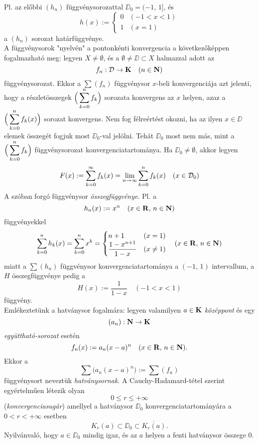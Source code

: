 Pl. az előbbi $(h_n)$ függvénysorozattal $\DD_0 = (-1, \, 1]$, és
\[
	h(x) := \begin{cases}
		0 & (-1 < x < 1) \\
		1 & (x = 1)
	\end{cases}
\]
a $(h_n)$ sorozat határfüggvénye.\\

A függvénysorok "nyelvén" a pontonkénti konvergencia a következőképpen fogalmazható meg: legyen $X \neq \emptyset$, és a $\emptyset \neq \DD \subset X$ halmazzal adott az
\[
	f_n : \mathcal{D} \to \mathbf{K} \quad (n \in \mathbf{N})
\]
függvénysorozat. Ekkor a $\sum(f_n)$ függvénysor $x$-beli konvergenciája azt jelenti, hogy a részletösszegek $\displaystyle \Big(\sum_{k=0}^n f_k \Big)$ sorozata konvergens az $x$ helyen, azaz a $\displaystyle \Big(\sum_{k=0}^n f_k(x) \Big)$ sorozat konvergens. Nem fog félreértést okozni, ha az ilyen $x \in \DD$ elemek összegét fogjuk most $\DD_0$-val jelölni. Tehát $\DD_0$ most nem más, mint a $\displaystyle \Big(\sum_{k=0}^n f_k \Big)$ függvénysorozat konvergenciatartománya. Ha $\DD_0 \neq \emptyset$, akkor legyen
\[
	F(x) := \sum_{k=0}^\infty f_k(x) = \lim_{n \to \infty} \sum_{k=0}^n f_k(x) \quad (x \in \mathcal{D}_0)
\]
A szóban forgó függvénysor \textit{összegfüggvénye}. Pl. a
\[
	h_n(x) := x^n \quad (x \in \mathbf{R}, \, n \in \mathbf{N})
\]
függvényekkel
\[
	\sum_{k=0}^n h_k(x) = \sum_{k=0}^n x^k = \begin{cases}
		n + 1 & (x = 1) \\
		\displaystyle \frac{1 - x^{n+1}}{1-x} & (x \neq 1)
	\end{cases} \quad (x \in \mathbf{R}, \, n \in \mathbf{N})
\]
miatt a $\sum(h_n)$ függvénysor konvergenciatartománya a $(-1, \, 1)$ intervallum, a $H$ összegfüggvénye pedig a
\[
	H(x) := \frac{1}{1-x} \quad (-1 < x < 1)
\]
függvény.\\

Emlékeztetünk a hatványsor fogalmára: legyen valamilyen $a \in \mathbf{K}$ \textit{középpont} és egy
\[
	(a_n) : \mathbf{N} \to \mathbf{K}
\]
\textit{együttható-sorozat} esetén
\[
	f_n(x) := a_n(x-a)^n \quad (x \in \mathbf{R}, \, n \in \mathbf{N}).
\]
Ekkor a
\[
	\sum\Big( a_n(x-a)^n \Big) := \sum(f_n)
\]
függvénysort neveztük \textit{hatványsornak}. A Cauchy-Hadamard-tétel szerint egyértelműen létezik olyan
\[
	0 \leq r \leq + \infty
\]
(\textit{konvergenciasugár}) amellyel a hatványsor $\DD_0$ konvergenciatartományára a $0 < r < + \infty$ esetben
\[
	K_r(a) \subset \DD_0 \subset \overline{K_r(a)}.
\]
Nyilvánvaló, hogy $a \in \DD_0$ mindig igaz, és az $a$ helyen a fenti hatványsor összege $0$.

